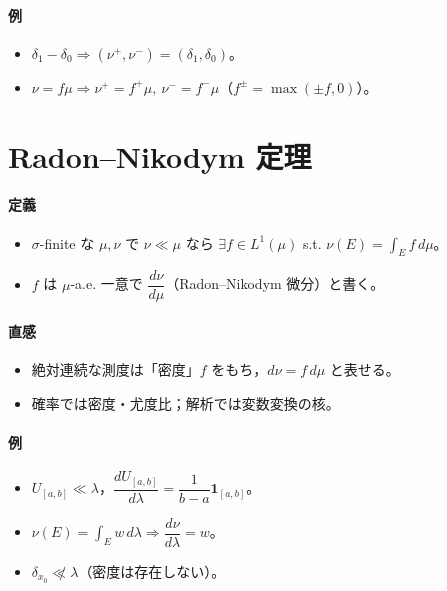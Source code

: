 \documentclass[dvipdfmx,autodetect-engine]{article}
\begin{document}
\paragraph{例}
\begin{itemize}
  \item \(\delta_{1}-\delta_{0}\Rightarrow(\nu^+,\nu^-)=(\delta_{1},\delta_{0})\)。
  \item \(\nu=f\mu\Rightarrow \nu^+=f^+\mu,\ \nu^-=f^-\mu\)（\(f^\pm=\max(\pm f,0)\)）。
\end{itemize}

\vspace{1em}

\section*{Radon--Nikodym 定理}
\paragraph{定義}
\begin{itemize}
  \item \(\sigma\)-finite な \(\mu,\nu\) で \(\nu\ll\mu\) なら \(\exists f\in L^1(\mu)\) s.t. \(\nu(E)=\int_E f\,d\mu\)。
  \item \(f\) は \(\mu\)-a.e. 一意で \(\dfrac{d\nu}{d\mu}\)（Radon--Nikodym 微分）と書く。
\end{itemize}
\paragraph{直感}
\begin{itemize}
  \item 絶対連続な測度は「密度」\(f\) をもち，\(d\nu=f\,d\mu\) と表せる。
  \item 確率では密度・尤度比；解析では変数変換の核。
\end{itemize}
\paragraph{例}
\begin{itemize}
  \item \(U_{[a,b]}\ll\lambda\)，\(\dfrac{dU_{[a,b]}}{d\lambda}=\dfrac{1}{b-a}\mathbf{1}_{[a,b]}\)。
  \item \(\nu(E)=\int_E w\,d\lambda\Rightarrow \dfrac{d\nu}{d\lambda}=w\)。
  \item \(\delta_{x_0}\not\ll\lambda\)（密度は存在しない）。
\end{itemize}
\end{document}
